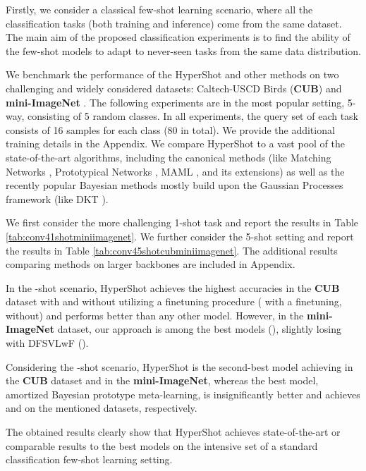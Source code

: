 \documentclass[nohyperref]{article}
\def\our{HyperShot}
\theoremstyle{plain}
\theoremstyle{definition}
\theoremstyle{remark}
\begin{document}
Firstly, we consider a classical few-shot learning scenario, where all the classification tasks (both training and inference) come from the same dataset. The main aim of the proposed classification experiments is to find the ability of the few-shot models to adapt to never-seen tasks from the same data distribution. 

We benchmark the performance of the \our{} and other methods on two challenging and widely considered datasets: Caltech-USCD Birds (\textbf{CUB}) \cite{wah2011cub} and \textbf{mini-ImageNet} \cite{ravi2016optimization}. The following experiments are in the most popular setting, 5-way, consisting of 5 random classes. In all experiments, the query set of each task consists of 16 samples for each class (80 in total).  We provide the additional training details in the Appendix.
We compare \our{} to a vast pool of the state-of-the-art algorithms, including the canonical methods (like Matching Networks \cite{vinyals2016matching}, Prototypical Networks \cite{snell2017prototypical}, MAML \cite{finn2017model}, and its extensions) as well as the recently popular Bayesian methods mostly build upon the Gaussian Processes framework (like DKT \cite{patacchiola2020bayesian}).


We first consider the more challenging 1-shot task and report the results in Table \ref{tab:conv41shotminiimagenet}. We further consider the 5-shot setting and report the results in Table \ref{tab:conv45shotcubminiimagenet}. The additional results comparing methods on larger backbones are included in Appendix.

In the -shot scenario, \our{} achieves the highest accuracies in the \textbf{CUB} dataset with and without utilizing a finetuning procedure ( with a finetuning,  without) and performs better than any other model. However, in the \textbf{mini-ImageNet} dataset, our approach is among the best models (), slightly losing with DFSVLwF \cite{gidaris2018dynamic} ().

Considering the -shot scenario, \our{} is the second-best model achieving  in the \textbf{CUB} dataset and  in the \textbf{mini-ImageNet}, whereas the best model, amortized Bayesian prototype meta-learning, is insignificantly better and achieves  and  on the mentioned datasets, respectively. 

The obtained results clearly show that \our{} achieves state-of-the-art or comparable results to the best models on the intensive set of a standard classification few-shot learning setting.
\end{document}
